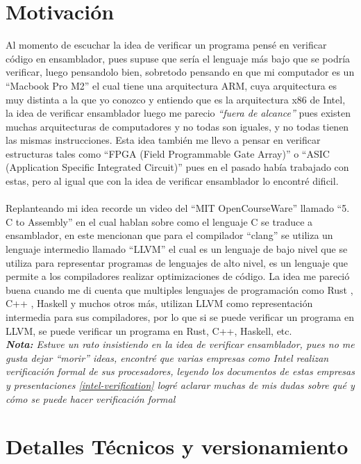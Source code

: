 \documentclass{hw-template}
\begin{document}
\section{Motivación}
Al momento de escuchar la idea de verificar un programa pensé en verificar código en ensamblador, pues supuse que sería el lenguaje más bajo que se podría verificar, luego pensandolo bien, sobretodo pensando en que mi computador es un ``Macbook Pro M2'' el cual tiene una arquitectura ARM, cuya arquitectura es muy distinta a la que yo conozco y entiendo que es la arquitectura x86 de Intel, la idea de verificar ensamblador luego me parecio \textit{``fuera de alcance''} pues existen muchas arquitecturas de computadores y no todas son iguales, y no todas tienen las mismas instrucciones. Esta idea también me llevo a pensar en verificar estructuras tales como ``FPGA (Field Programmable Gate Array)'' o ``ASIC (Application Specific Integrated Circuit)'' pues en el pasado había trabajado con estas, pero al igual que con la idea de verificar ensamblador lo encontré dificil.\\\\
Replanteando mi idea recorde un video del ``MIT OpenCourseWare'' llamado ``5. C to Assembly'' en el cual hablan sobre como el lenguaje C se traduce a ensamblador, en este mencionan que para el compilador ``clang'' se utiliza un lenguaje intermedio llamado ``LLVM'' el cual es un lenguaje de bajo nivel que se utiliza para representar programas de lenguajes de alto nivel, es un lenguaje que permite a los compiladores realizar optimizaciones de código. La idea me pareció buena cuando me di cuenta que multiples lenguajes de programación como Rust \cite{rust}, C++ \cite{cpp}, Haskell \cite{haskell} y muchos otros más, utilizan LLVM como representación intermedia para sus compiladores, por lo que si se puede verificar un programa en LLVM, se puede verificar un programa en Rust, C++, Haskell, etc.\\

\textit{\textbf{Nota:} Estuve un rato insistiendo en la idea de verificar ensamblador, pues no me gusta dejar ``morir'' ideas, encontré que varias empresas como Intel realizan verificación formal de sus procesadores, leyendo los documentos de estas empresas y presentaciones \ref{intel-verification} logré aclarar muchas de mis dudas sobre qué y cómo se puede hacer verificación formal} 

\section{Detalles Técnicos y versionamiento}
\end{document}
